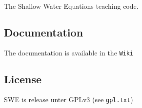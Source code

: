 The Shallow Water Equations teaching code.

\subsection*{Documentation }

The documentation is available in the {\tt Wiki}

\subsection*{License }

S\-W\-E is release unter G\-P\-Lv3 (see {\tt gpl.\-txt}) 